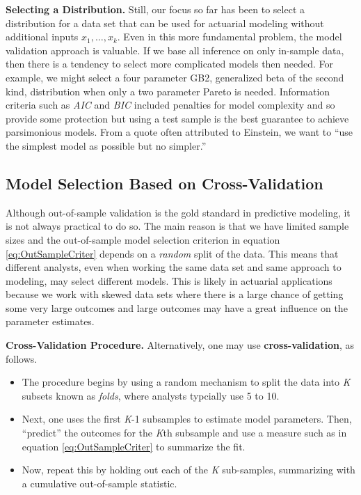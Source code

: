\documentclass[]{book}
\theoremstyle{definition}
\theoremstyle{definition}
\theoremstyle{definition}
\theoremstyle{remark}
\begin{document}
\textbf{Selecting a Distribution.} Still, our focus so far has been to
select a distribution for a data set that can be used for actuarial
modeling without additional inputs \(x_1, \ldots, x_k\). Even in this
more fundamental problem, the model validation approach is valuable. If
we base all inference on only in-sample data, then there is a tendency
to select more complicated models then needed. For example, we might
select a four parameter GB2, generalized beta of the second kind,
distribution when only a two parameter Pareto is needed. Information
criteria such as \emph{AIC} and \emph{BIC} included penalties for model
complexity and so provide some protection but using a test sample is the
best guarantee to achieve parsimonious models. From a quote often
attributed to Einstein, we want to ``use the simplest model as possible
but no simpler.''

\subsection{Model Selection Based on
Cross-Validation}\label{model-selection-based-on-cross-validation}

Although out-of-sample validation is the gold standard in predictive
modeling, it is not always practical to do so. The main reason is that
we have limited sample sizes and the out-of-sample model selection
criterion in equation \eqref{eq:OutSampleCriter} depends on a
\emph{random} split of the data. This means that different analysts,
even when working the same data set and same approach to modeling, may
select different models. This is likely in actuarial applications
because we work with skewed data sets where there is a large chance of
getting some very large outcomes and large outcomes may have a great
influence on the parameter estimates.

\textbf{Cross-Validation Procedure.} Alternatively, one may use
\textbf{cross-validation}, as follows.

\begin{itemize}
\item
  The procedure begins by using a random mechanism to split the data
  into \emph{K} subsets known as \emph{folds}, where analysts typcially
  use 5 to 10.
\item
  Next, one uses the first \emph{K}-1 subsamples to estimate model
  parameters. Then, ``predict'' the outcomes for the \emph{K}th
  subsample and use a measure such as in equation
  \eqref{eq:OutSampleCriter} to summarize the fit.
\item
  Now, repeat this by holding out each of the \emph{K} sub-samples,
  summarizing with a cumulative out-of-sample statistic.
\end{itemize}
\end{document}
